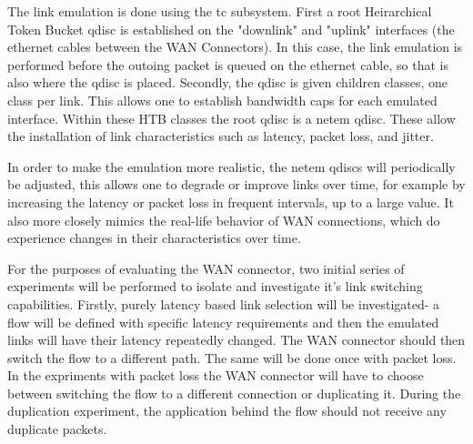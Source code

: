 The link emulation is done using the tc subsystem. First a root Heirarchical Token Bucket qdisc is established on the "downlink" and "uplink" interfaces (the ethernet cables between the WAN Connectors). In this case, the link emulation is performed before the outoing packet is queued on the ethernet cable, so that is also where the qdisc is placed. Secondly, the qdisc is given children classes, one class per link. This allows one to establish bandwidth caps for each emulated interface. Within these HTB classes the root qdisc is a netem qdisc. These allow the installation of link characteristics such as latency, packet loss, and jitter.



In order to make the emulation more realistic, the netem qdiscs will periodically be adjusted, this allows one to degrade or improve links over time, for example by increasing the latency or packet loss in frequent intervals, up to a large value. It also more closely mimics the real-life behavior of WAN connections, which do experience changes in their characteristics over time.

For the purposes of evaluating the WAN connector, two initial series of experiments will be performed to isolate and investigate it's link switching capabilities. Firstly, purely latency based link selection will be investigated- a flow will be defined with specific latency requirements and then the emulated links will have their latency repeatedly changed. The WAN connector should then switch the flow to a different path. The same will be done once with packet loss. In the expriments with packet loss the WAN connector will have to choose between switching the flow to a different connection or duplicating it. During the duplication experiment, the application behind the flow should not receive any duplicate packets.

